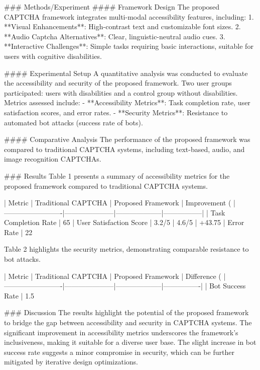 ### Methods/Experiment  
#### Framework Design  
The proposed CAPTCHA framework integrates multi-modal accessibility features, including:  
1. **Visual Enhancements**: High-contrast text and customizable font sizes.  
2. **Audio Captcha Alternatives**: Clear, linguistic-neutral audio cues.  
3. **Interactive Challenges**: Simple tasks requiring basic interactions, suitable for users with cognitive disabilities.  

#### Experimental Setup  
A quantitative analysis was conducted to evaluate the accessibility and security of the proposed framework. Two user groups participated: users with disabilities and a control group without disabilities. Metrics assessed include:  
- **Accessibility Metrics**: Task completion rate, user satisfaction scores, and error rates.  
- **Security Metrics**: Resistance to automated bot attacks (success rate of bots).  

#### Comparative Analysis  
The performance of the proposed framework was compared to traditional CAPTCHA systems, including text-based, audio, and image recognition CAPTCHAs.

### Results  
Table 1 presents a summary of accessibility metrics for the proposed framework compared to traditional CAPTCHA systems.

| Metric                  | Traditional CAPTCHA | Proposed Framework | Improvement (%
|-------------------------|---------------------|--------------------|-----------------|
| Task Completion Rate    | 65%
| User Satisfaction Score | 3.2/5              | 4.6/5             | +43.75%
| Error Rate              | 22%

Table 2 highlights the security metrics, demonstrating comparable resistance to bot attacks.

| Metric                  | Traditional CAPTCHA | Proposed Framework | Difference (%
|-------------------------|---------------------|--------------------|----------------|
| Bot Success Rate        | 1.5%

### Discussion  
The results highlight the potential of the proposed framework to bridge the gap between accessibility and security in CAPTCHA systems. The significant improvement in accessibility metrics underscores the framework's inclusiveness, making it suitable for a diverse user base. The slight increase in bot success rate suggests a minor compromise in security, which can be further mitigated by iterative design optimizations.

